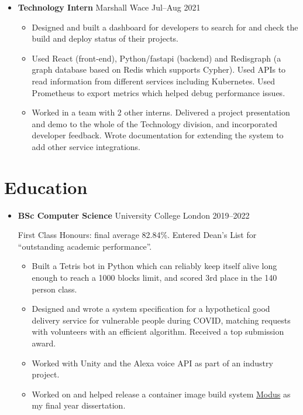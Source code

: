 \begin{itemize}
    \item \textbf{Technology Intern} \dashdiv{} Marshall Wace \dashdiv{} Jul--Aug 2021

    \begin{itemize}
      \item Designed and built a dashboard for developers to search for and check the build and deploy status of their projects.
      \item Used React (front-end), Python/fastapi (backend) and Redisgraph (a graph database based on Redis which supports Cypher). Used APIs to read information from different services including Kubernetes. Used Prometheus to export metrics which helped debug performance issues.
      \item Worked in a team with 2 other interns. Delivered a project presentation and demo to the whole of the Technology division, and incorporated developer feedback. Wrote documentation for extending the system to add other service integrations.
    \end{itemize}

  \end{itemize}

  \section{Education}

  \begin{itemize}
    \item \textbf{BSc Computer Science} \dashdiv{} University College London \dashdiv{} 2019--2022

      First Class Honours: final average 82.84\%. Entered Dean's List for ``outstanding academic performance''.

      \begin{itemize}
        \item Built a Tetris bot in Python which can reliably keep itself alive long enough to reach a 1000 blocks limit, and scored 3rd place in the 140 person class.

        \item Designed and wrote a system specification for a hypothetical good delivery service for vulnerable people during COVID, matching requests with volunteers with an efficient algorithm. Received a top submission award.

        \item Worked with Unity and the Alexa voice API as part of an industry project.

        \item Worked on and helped release a container image build system \href{https://modus-continens.com/}{\color{link}Modus} as my final year dissertation.
      \end{itemize}


  \end{itemize}

